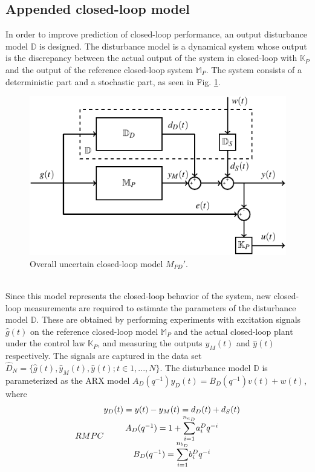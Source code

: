 \documentclass[letterpaper, 10 pt, conference]{ieeeconf}  %
\begin{document}
	\subsection{Appended closed-loop model}
	In order to improve prediction of closed-loop performance, an output disturbance model $\mathbb{D}$ is designed. The disturbance model is a dynamical system whose output is the discrepancy between the actual output of the system in closed-loop with  $\mathbb{K}_P$ and the output of the reference closed-loop system $\mathbb{M}_P$. The system consists of a deterministic part and a stochastic part, as seen in Fig. \ref{Appended}.
	\begin{figure}[h!]
		\hspace{20pt}
		\includegraphics[scale = 0.7]{Mp-D-E.pdf}
		\caption{Overall uncertain closed-loop model $M_{PD}'$.}
		\label{Appended}
	\end{figure}
	\vspace{-5pt} \\
	Since this model represents the closed-loop behavior of the system, new closed-loop measurements are required to estimate the parameters of the disturbance model $\mathbb{D}$. These are obtained by performing experiments with excitation signals $\hat{g}(t)$ on the reference closed-loop model $\mathbb{M}_P$ and the actual closed-loop plant under the control law $\mathbb{K}_P$, and measuring the outputs $\hat{y}_M(t)$ and $\hat{y}(t)$ respectively. The signals are captured in the data set $\hat{D}_{N}=\{\hat{g}(t),\hat{y}_M(t),\hat{y}(t);t\in{1,...,N}\}$.
	The disturbance model $\mathbb{D}$ is parameterized as the ARX model $A_D(q^{-1})y_D(t) = B_D(q^{-1})v(t)+w(t)$, where 
	\begin{equation*}RMPC
	\begin{matrix}
	y_D(t) = y(t) - y_M(t) = d_D(t)+d_S(t) \\ 
	A_D(q^{-1}) = 1+\mathlarger{\sum\limits_{i=1}^{n_{a_D}}}a_i^Dq^{-i}\\
	B_D(q^{-1}) = \mathlarger{\sum\limits_{i=1}^{n_{b_D}}}b_i^Dq^{-i}
	\end{matrix}  
	\end{equation*}
\end{document}
